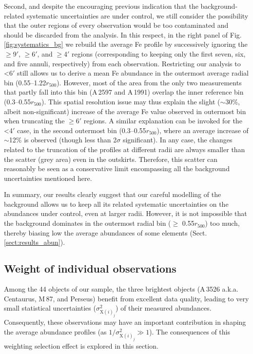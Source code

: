 \documentclass{aa}
\begin{document}
Second, and despite the encouraging previous indication that the background-related systematic uncertainties are under control, we still consider the possibility that the outer regions of every observation would be too contaminated and should be discarded from the analysis. In this respect, in the right panel of Fig. \ref{fig:systematics_bg} we rebuild the average Fe profile by successively ignoring the $\ge$9$'$, $\ge$6$'$, and $\ge$4$'$ regions (corresponding to keeping only the first seven, six, and five annuli, respectively) from each observation. Restricting our analysis to <6$'$ still allows us to derive a mean Fe abundance in the outermost average radial bin (0.55--1.22$r_{500}$). However, most of the area from the only two measurements that partly fall into this bin (A\,2597 and A\,1991) overlap the inner reference bin (0.3--0.55$r_{500}$). This spatial resolution issue may thus explain the slight ($\sim$30\%, albeit non-significant) increase of the average Fe value observed in outermost bin when truncating the $\ge$6$'$ regions. A similar explanation can be invoked for the <4$'$ case, in the second outermost bin (0.3--0.55$r_{500}$), where an average increase of $\sim$12\% is observed (though less than 2$\sigma$ significant). In any case, the changes related to the truncation of the profiles at different radii are always smaller than the scatter (grey area) even in the outskirts. Therefore, this scatter can reasonably be seen as a conservative limit encompassing all the background uncertainties mentioned here.

In summary, our results clearly suggest that our careful modelling of the background allows us to keep all its related systematic uncertainties on the abundances under control, even at larger radii. However, it is not impossible that the background dominates in the outermost radial bin ($\ge$ 0.55$r_{500}$) too much, thereby biasing low the average abundances of some elements (Sect. \ref{sect:results_abun}).








\subsection{Weight of individual observations}\label{sect:systematics_weight}

Among the 44 objects of our sample, the three brightest objects (A\,3526 a.k.a. Centaurus, M\,87, and Perseus) benefit from excellent data quality, leading to very small statistical uncertainties ($\sigma^2_{\text{X}(i)_j}$) of their measured abundances. Consequently, these observations may have an important contribution in shaping the average abundance profiles (as $1 / \sigma^2_{\text{X}(i)_j} \gg 1$). The consequences of this weighting selection effect is explored in this section.
\end{document}
